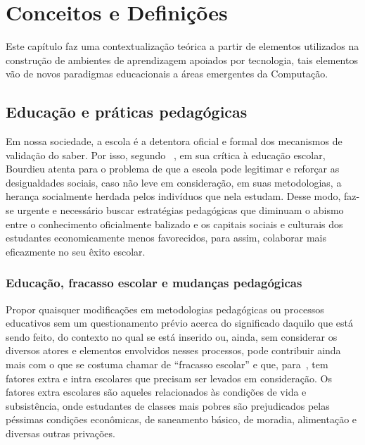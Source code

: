 \chapter{Conceitos e Definições}
\label{Chap:background}

Este capítulo faz uma contextualização teórica a partir de elementos utilizados na construção de ambientes de aprendizagem apoiados por tecnologia, tais elementos vão de novos paradigmas educacionais a áreas emergentes da Computação.

\section{Educação e práticas pedagógicas}\label{section:educacao_praticas}
Em nossa sociedade, a escola é a detentora oficial e formal dos mecanismos de validação do saber. Por isso, segundo ~\cite{Nogueira:2013}, em sua crítica à educação escolar, Bourdieu atenta para o problema de que a escola pode legitimar e reforçar as desigualdades sociais, caso não leve em consideração, em suas metodologias, a herança socialmente herdada pelos indivíduos que nela estudam. Desse modo, faz-se urgente e necessário buscar estratégias pedagógicas que diminuam o abismo entre o conhecimento oficialmente balizado e os capitais sociais e culturais dos estudantes economicamente menos favorecidos, para assim, colaborar mais eficazmente no seu êxito escolar.
 
\subsection{Educação, fracasso escolar e mudanças pedagógicas}\label{section:educacao_fracasso_mudancas}

Propor quaisquer modificações em metodologias pedagógicas ou processos educativos sem um questionamento prévio acerca do significado daquilo que está sendo feito, do contexto no qual se está inserido ou, ainda, sem considerar os diversos atores e elementos envolvidos nesses processos, pode contribuir ainda mais com o que se costuma chamar de ``fracasso escolar'' e que, para~\cite{Collares:1989}, tem fatores extra e intra escolares que precisam ser levados em consideração. Os fatores extra escolares são aqueles relacionados às condições de vida e subsistência, onde estudantes de classes mais pobres são prejudicados pelas péssimas condições econômicas, de saneamento básico, de moradia, alimentação e diversas outras privações.

